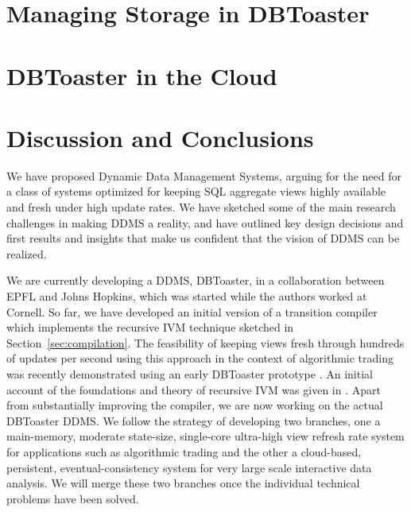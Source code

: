 \documentclass{sig-alternate}
\newcommand{\comment}[1]{}
\begin{document}
\section{Managing Storage in DBToaster}
\label{sec:storage}



\section{DBToaster in the Cloud}
\label{sec:distribution}


\section{Discussion and Conclusions}
We have proposed Dynamic Data Management Systems,
arguing for the need for a class of systems optimized
for keeping SQL aggregate views highly available and fresh under
high update rates.
We have sketched some of the main research challenges in
making DDMS a reality, and have outlined key design decisions
and first results and insights that make us confident that
the vision of DDMS can be realized.

We are currently developing a DDMS, DBToaster, in a collaboration
between EPFL and Johns Hopkins, which was started while the
authors worked at Cornell.
%
So far, we have developed an initial version of a
transition compiler which implements the recursive IVM technique
sketched in Section~\ref{sec:compilation}. The feasibility of
keeping views fresh through hundreds of updates per second using
this approach in the context of algorithmic trading
was recently demonstrated using an early DBToaster prototype
\cite{ahmad-vldb:09}. An initial account of the foundations and
theory of recursive IVM was given in \cite{koch-pods:10}.
Apart from substantially improving the compiler,
we are now working on the actual DBToaster DDMS. We follow the
strategy of developing two branches, one a main-memory, moderate
state-size, single-core ultra-high view refresh rate system for
applications such as algorithmic trading and the other
a cloud-based, persistent, eventual-consistency system for
very large scale interactive data analysis. We will
merge these two branches once the individual technical
problems have been solved.


\comment{
Current ongoing research and development directions in
the DBToaster project include: i) leveraging
structural recursion to build a main-memory query processing library based on
functional programming techniques (see Section~\ref{sec:compilation}); ii)
parallelization, deployment and experimentation of a continuous analytics engine
in a cloud environment; iii) analysing the benefits of our execution model in a
batch operating mode on top of map-reduce.
} %


\scriptsize{


}
\end{document}
